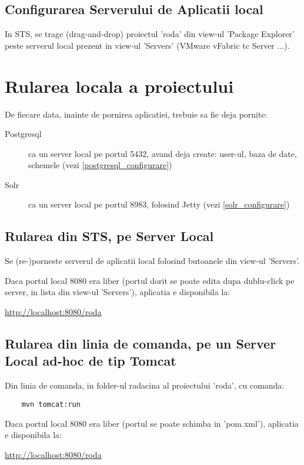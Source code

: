 
\subsection{Configurarea Serverului de Aplicatii local}
In STS, se trage (drag-and-drop) proiectul 'roda' din view-ul 'Package Explorer' 
peste serverul local prezent in view-ul 'Servers' (VMware vFabric tc Server ...).

\section{Rularea locala a proiectului}

De fiecare data, inainte de pornirea aplicatiei, trebuie sa fie deja pornite:
\begin{description}
\item[Postgresql] 
ca un server local pe portul 5432, avand deja create: 
user-ul, baza de date, schemele (vezi \ref{postgresql_configurare})
\item[Solr] 
ca un server local pe portul 8983, folosind Jetty (vezi \ref{solr_configurare})
\end{description}

\subsection{Rularea din STS, pe Server Local}
Se (re-)porneste serverul de aplicatii local folosind butoanele din view-ul
'Servers'.

Daca portul local 8080 era liber (portul dorit se poate edita dupa dublu-click pe
server, in lista din view-ul 'Servers'), aplicatia e disponibila la:

\url{http://localhost:8080/roda}

\subsection{Rularea din linia de comanda, pe un Server Local ad-hoc de tip
Tomcat}
Din linia de comanda, in folder-ul radacina al proiectului 'roda', cu comanda:
\begin{lstlisting}
	mvn tomcat:run
\end{lstlisting}
Daca portul local 8080 era liber (portul se poate schimba in 'pom.xml'),
aplicatia e disponibila la:

\url{http://localhost:8080/roda}

